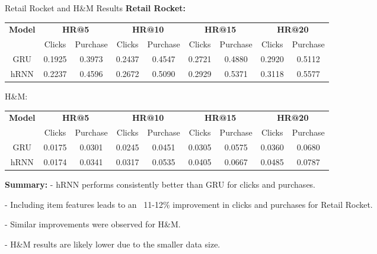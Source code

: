\documentclass{beamer}
\begin{document}
\begin{frame}{Retail Rocket and H\&M Results}
\textbf{Retail Rocket:}
\begin{center}
\begin{center}

\begin{tabular}{|c|c|c|c|c|c|c|c|c|}
\hline
\textbf{Model} & \multicolumn{2}{|c|}{\textbf{HR@5}} & \multicolumn{2}{|c|}{\textbf{HR@10}} & \multicolumn{2}{|c|}{\textbf{HR@15}} & \multicolumn{2}{|c|}{\textbf{HR@20}}\\
\cline{2-9}
& Clicks & Purchase & Clicks & Purchase & Clicks & Purchase & Clicks & Purchase\\
\hline
GRU & \scriptsize{0.1925} & \scriptsize{0.3973} & \scriptsize{0.2437} & \scriptsize{0.4547} & \scriptsize{0.2721} & \scriptsize{0.4880} & \scriptsize{0.2920} & \scriptsize{0.5112}\\
hRNN & \scriptsize{0.2237} & \scriptsize{0.4596} & \scriptsize{0.2672} & \scriptsize{0.5090} & \scriptsize{0.2929} & \scriptsize{0.5371} & \scriptsize{0.3118} & \scriptsize{0.5577}\\
\hline
\end{tabular}

\smallskip
H\&M:

\smallskip
\begin{tabular}{|c|c|c|c|c|c|c|c|c|}
\hline
\textbf{Model} & \multicolumn{2}{|c|}{\textbf{HR@5}} & \multicolumn{2}{|c|}{\textbf{HR@10}} & \multicolumn{2}{|c|}{\textbf{HR@15}} & \multicolumn{2}{|c|}{\textbf{HR@20}}\\
\cline{2-9}
& Clicks & Purchase & Clicks & Purchase & Clicks & Purchase & Clicks & Purchase\\
\hline
GRU & \scriptsize{0.0175} & \scriptsize{0.0301} & \scriptsize{0.0245} & \scriptsize{0.0451} & \scriptsize{0.0305} & \scriptsize{0.0575} & \scriptsize{0.0360} & \scriptsize{0.0680}\\
hRNN & \scriptsize{0.0174} & \scriptsize{0.0341} & \scriptsize{0.0317} & \scriptsize{0.0535} & \scriptsize{0.0405} & \scriptsize{0.0667} & \scriptsize{0.0485} & \scriptsize{0.0787}\\
\hline
\end{tabular}



\end{center}
\end{center}

\textbf{Summary:}
- hRNN performs consistently better than GRU for clicks and purchases.

- Including item features leads to an ~11-12\% improvement in clicks and purchases for Retail Rocket.

- Similar improvements were observed for H\&M.

- H\&M results are likely lower due to the smaller data size.

\end{frame}
\end{document}

